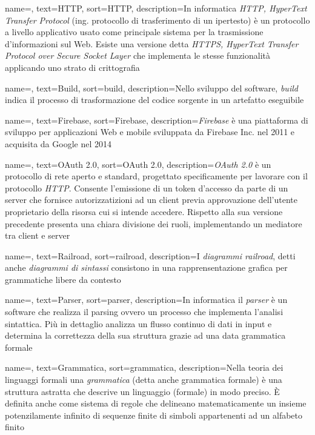 {
	name=,
	text=HTTP,
	sort=HTTP,
	description={In informatica \emph{HTTP, HyperText Transfer Protocol} (ing. protocollo di trasferimento di un ipertesto) è un protocollo a livello applicativo usato come principale sistema per la trasmissione d'informazioni sul Web. Esiste una versione detta \emph{HTTPS, HyperText Transfer Protocol over Secure Socket Layer} che implementa le stesse funzionalità applicando uno strato di crittografia}
}

{
	name=,
	text=Build,
	sort=build,
	description={Nello sviluppo del software, \emph{build} indica il processo di trasformazione del codice sorgente in un artefatto eseguibile}
}

{
	name=,
	text=Firebase,
	sort=Firebase,
	description={\emph{Firebase} è una piattaforma di sviluppo per applicazioni Web e mobile sviluppata da Firebase Inc. nel 2011 e acquisita da Google nel 2014}
}

{
	name=,
	text=OAuth 2.0,
	sort=OAuth 2.0,
	description={\emph{OAuth 2.0} è un protocollo di rete aperto e standard, progettato specificamente per lavorare con il protocollo \emph{HTTP}. Consente l'emissione di un token d'accesso da parte di un server che fornisce autorizzatizioni ad un client previa approvazione dell'utente proprietario della risorsa cui si intende accedere. Rispetto alla sua versione precedente presenta una chiara divisione dei ruoli, implementando un mediatore tra client e server}
}

{
	name=,
	text=Railroad,
	sort=railroad,
	description={I \emph{diagrammi railroad}, detti anche \emph{diagrammi di sintassi} consistono in una rapprensentazione grafica per grammatiche libere da contesto}
}

{
	name=,
	text=Parser,
	sort=parser,
	description={In informatica il \emph{parser} è un software che realizza il parsing ovvero un processo che implementa l'analisi sintattica. Più in dettaglio analizza un flusso continuo di dati in input e determina la correttezza della sua struttura grazie ad una data grammatica formale}
}

{
	name=,
	text=Grammatica,
	sort=grammatica,
	description={Nella teoria dei linguaggi formali una \emph{grammatica} (detta anche grammatica formale) è una struttura astratta che descrive un linguaggio (formale) in modo preciso. È definita anche come sistema di regole che delineano matematicamente un insieme potenzilamente infinito di sequenze finite di simboli appartenenti ad un alfabeto finito}
}

